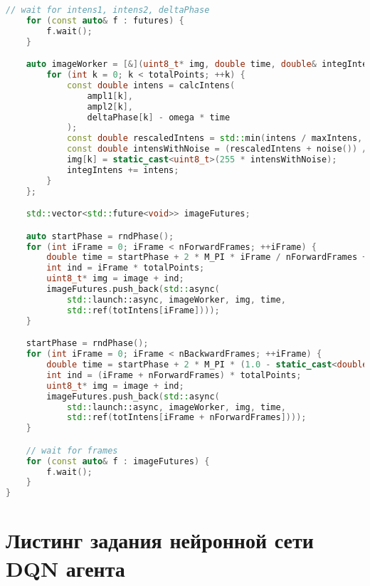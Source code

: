 \begin{lstlisting}[language=C++,tabsize=4,label={lst:calcImage},caption={Листинг функции вычисления интерференционной картины}]
    // wait for intens1, intens2, deltaPhase
	for (const auto& f : futures) {
		f.wait();
	}

    auto imageWorker = [&](uint8_t* img, double time, double& integIntens) {
        for (int k = 0; k < totalPoints; ++k) {
            const double intens = calcIntens(
                ampl1[k], 
                ampl2[k], 
                deltaPhase[k] - omega * time
            );
            const double rescaledIntens = std::min(intens / maxIntens, 1.0);
            const double intensWithNoise = (rescaledIntens + noise()) / (1 + noiseCoeff);
            img[k] = static_cast<uint8_t>(255 * intensWithNoise);
            integIntens += intens;
        }
    };

    std::vector<std::future<void>> imageFutures;

    auto startPhase = rndPhase();
    for (int iFrame = 0; iFrame < nForwardFrames; ++iFrame) {
        double time = startPhase + 2 * M_PI * iFrame / nForwardFrames + piezoNoise();
        int ind = iFrame * totalPoints;
        uint8_t* img = image + ind;
        imageFutures.push_back(std::async(
            std::launch::async, imageWorker, img, time,
            std::ref(totIntens[iFrame])));
    }

    startPhase = rndPhase();
    for (int iFrame = 0; iFrame < nBackwardFrames; ++iFrame) {
        double time = startPhase + 2 * M_PI * (1.0 - static_cast<double>(iFrame) / nBackwardFrames) + piezoNoise();
        int ind = (iFrame + nForwardFrames) * totalPoints;
        uint8_t* img = image + ind;
        imageFutures.push_back(std::async(
            std::launch::async, imageWorker, img, time,
            std::ref(totIntens[iFrame + nForwardFrames])));
    }

    // wait for frames
    for (const auto& f : imageFutures) {
        f.wait();
    }
}
\end{lstlisting}

\section{Листинг задания нейронной сети DQN агента}\label{app:A4}


